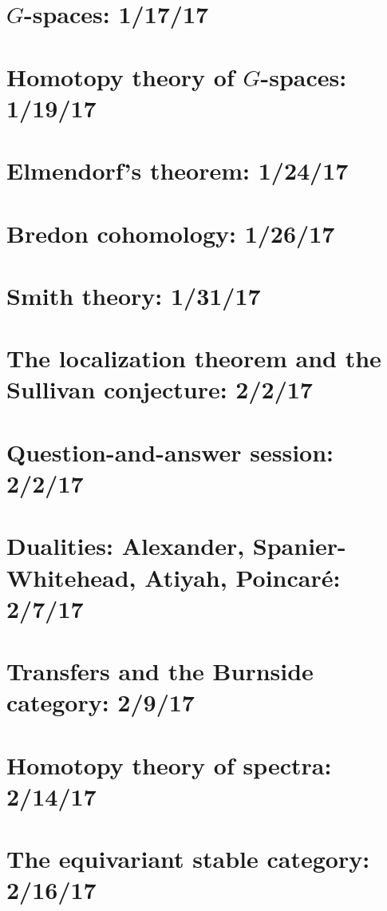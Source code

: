 \documentclass{style_EHT}
\begin{document}
\frontstuff

\section{\texorpdfstring{$G$}{G}-spaces: 1/17/17}
	
\section{Homotopy theory of \texorpdfstring{$G$}{G}-spaces: 1/19/17}
	
\section{Elmendorf's theorem: 1/24/17}
	
\section{Bredon cohomology: 1/26/17}
	
\section{Smith theory: 1/31/17}
	
\section{The localization theorem and the Sullivan conjecture: 2/2/17}
	
\section{Question-and-answer session: 2/2/17}
	
\section{Dualities: Alexander, Spanier-Whitehead, Atiyah, Poincaré: 2/7/17}
	
\section{Transfers and the Burnside category: 2/9/17}
	
\section{Homotopy theory of spectra: 2/14/17}
	
\section{The equivariant stable category: 2/16/17}
	

{}

\end{document}
